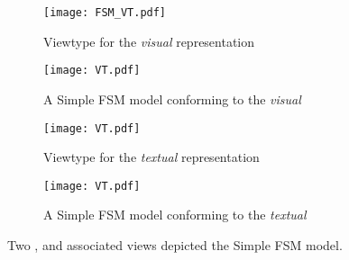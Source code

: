 \begin{figure*}
    \centering
    \begin{subfigure}[b]{0.45\textwidth}
			\centering
      \texttt{[image: FSM\_VT.pdf]}
      \caption{Viewtype for the \emph{visual} representation}
      \label{fig:VT:VMM}
    \end{subfigure}
    \hfill
    \begin{subfigure}[b]{0.45\textwidth}
			\centering
      \texttt{[image: VT.pdf]}
      \caption{A \textsf{Simple FSM} model conforming to the \emph{visual} \viewtype}
      \label{fig:VT:VM}
    \end{subfigure}
    \hfill
    \begin{subfigure}[b]{0.45\textwidth}
			\centering
      \texttt{[image: VT.pdf]}
      \caption{Viewtype for the \emph{textual} representation }
      \label{fig:VT:TMM}
    \end{subfigure}
    \hfill
    \begin{subfigure}[b]{0.45\textwidth}
			\centering
      \texttt{[image: VT.pdf]}
      \caption{A \textsf{Simple FSM} model conforming to the \emph{textual} \viewtype}
      \label{fig:VT:TM}
    \end{subfigure}
    \caption{Two \viewtypes, and associated views depicted the \textsf{Simple FSM} model.}
    \label{fig:VT}
\end{figure*}
